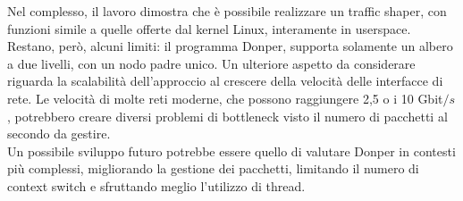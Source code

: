 \vspace*{0.01\textheight}
Nel complesso, il lavoro dimostra che è possibile realizzare un traffic shaper, con funzioni simile a quelle offerte dal kernel Linux, interamente in userspace. \\ 
Restano, però, alcuni limiti: il programma Donper, supporta solamente un albero a due livelli, con un nodo padre unico. Un ulteriore aspetto da considerare riguarda la scalabilità dell'approccio al crescere della velocità delle interfacce di rete.
Le velocità di molte reti moderne, che possono raggiungere 2,5 o i 10 Gbit$/s$, potrebbero creare diversi problemi di bottleneck visto il numero di pacchetti al secondo da gestire. \\ 
\vspace*{0.01\textheight}
Un possibile sviluppo futuro potrebbe essere quello di valutare Donper in contesti più complessi, migliorando la gestione dei pacchetti, limitando il numero di context switch e sfruttando meglio l'utilizzo di thread.
